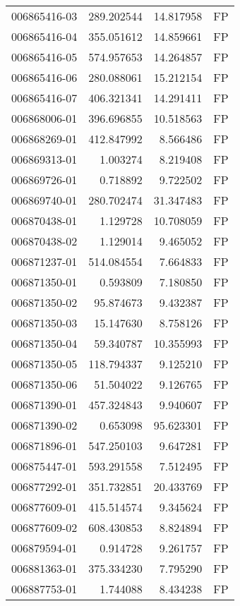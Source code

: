 \begin{tabular}{lrrl}
006865416-03 &  289.202544 &    14.817958 &   FP \\
006865416-04 &  355.051612 &    14.859661 &   FP \\
006865416-05 &  574.957653 &    14.264857 &   FP \\
006865416-06 &  280.088061 &    15.212154 &   FP \\
006865416-07 &  406.321341 &    14.291411 &   FP \\
006868006-01 &  396.696855 &    10.518563 &   FP \\
006868269-01 &  412.847992 &     8.566486 &   FP \\
006869313-01 &    1.003274 &     8.219408 &   FP \\
006869726-01 &    0.718892 &     9.722502 &   FP \\
006869740-01 &  280.702474 &    31.347483 &   FP \\
006870438-01 &    1.129728 &    10.708059 &   FP \\
006870438-02 &    1.129014 &     9.465052 &   FP \\
006871237-01 &  514.084554 &     7.664833 &   FP \\
006871350-01 &    0.593809 &     7.180850 &   FP \\
006871350-02 &   95.874673 &     9.432387 &   FP \\
006871350-03 &   15.147630 &     8.758126 &   FP \\
006871350-04 &   59.340787 &    10.355993 &   FP \\
006871350-05 &  118.794337 &     9.125210 &   FP \\
006871350-06 &   51.504022 &     9.126765 &   FP \\
006871390-01 &  457.324843 &     9.940607 &   FP \\
006871390-02 &    0.653098 &    95.623301 &   FP \\
006871896-01 &  547.250103 &     9.647281 &   FP \\
006875447-01 &  593.291558 &     7.512495 &   FP \\
006877292-01 &  351.732851 &    20.433769 &   FP \\
006877609-01 &  415.514574 &     9.345624 &   FP \\
006877609-02 &  608.430853 &     8.824894 &   FP \\
006879594-01 &    0.914728 &     9.261757 &   FP \\
006881363-01 &  375.334230 &     7.795290 &   FP \\
006887753-01 &    1.744088 &     8.434238 &   FP \\

\end{tabular}
